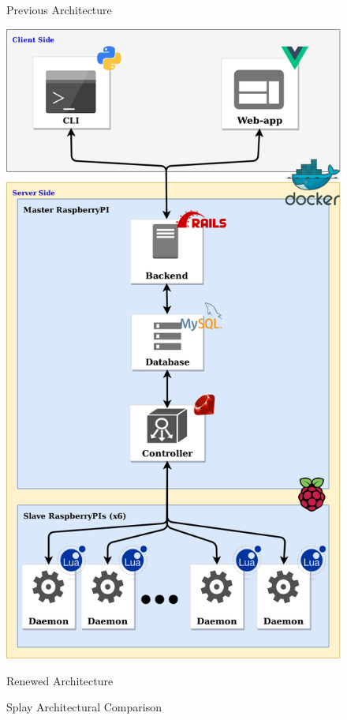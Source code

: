 \documentclass{eplmastersthesis}
\begin{document}
\begin{figure}[!tbp]
\begin{minipage}[b]{0.45\textwidth}
          \caption{Previous Architecture}
        \end{minipage}
        \hfill
        \begin{minipage}[b]{0.45\textwidth}
          \includegraphics[width=\textwidth]{figures/new_arch.png}
          \caption{Renewed Architecture}
        \end{minipage}
        \caption{Splay Architectural Comparison}
        \label{fig:test}
      \end{figure}
\end{document}
